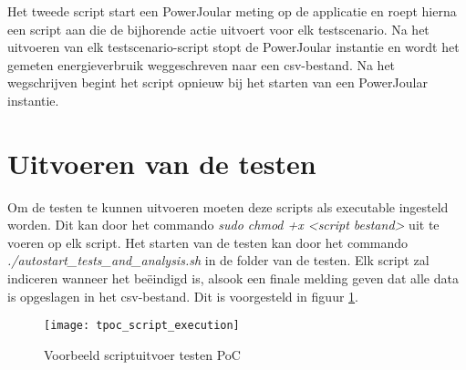 Het tweede script start een PowerJoular meting op de applicatie en roept hierna een script aan die de bijhorende actie uitvoert voor elk testscenario. Na het uitvoeren van elk testscenario-script stopt de PowerJoular instantie en wordt het gemeten energieverbruik weggeschreven naar een csv-bestand. Na het wegschrijven begint het script opnieuw bij het starten van een PowerJoular instantie.\\

\section{Uitvoeren van de testen}
Om de testen te kunnen uitvoeren moeten deze scripts als executable ingesteld worden. Dit kan door het commando \textit{sudo chmod +x <script bestand>} uit te voeren op elk script. Het starten van de testen kan door het commando \textit{./autostart\_tests\_and\_analysis.sh} in de folder van de testen. Elk script zal indiceren wanneer het beëindigd is, alsook een finale melding geven dat alle data is opgeslagen in het csv-bestand. Dit is voorgesteld in figuur \ref{tpoc_script_output}.\\  
\begin{figure}[h!]
    \texttt{[image: tpoc\_script\_execution]}
    \centering
    \caption{Voorbeeld scriptuitvoer testen PoC}
    \label{tpoc_script_output}
\end{figure}